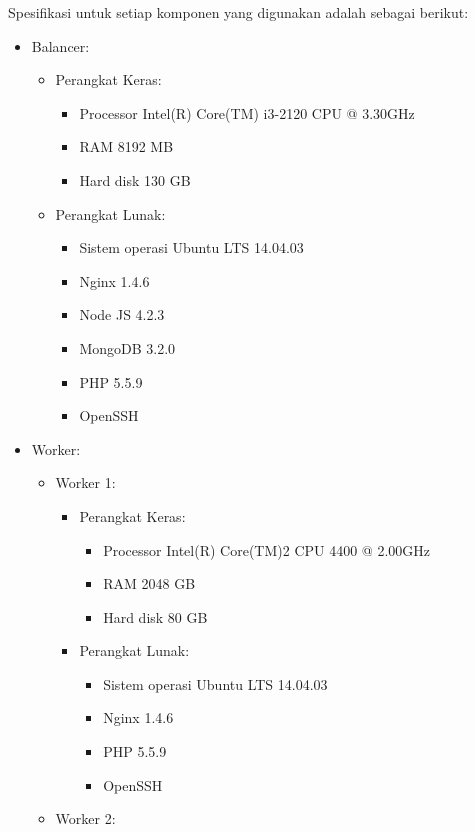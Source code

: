 \documentclass{ta-its}
\begin{document}
			Spesifikasi untuk setiap komponen yang digunakan adalah sebagai berikut:
			\begin{itemize}
				\item Balancer:
				\begin{itemize}
					\item Perangkat Keras:
					\begin{itemize}
						\item Processor Intel(R) Core(TM) i3-2120 CPU @ 3.30GHz
						\item RAM 8192 MB
						\item Hard disk 130 GB
					\end{itemize}
					\item Perangkat Lunak:
					\begin{itemize}
						\item Sistem operasi Ubuntu LTS 14.04.03
						\item Nginx 1.4.6
						\item Node JS 4.2.3
						\item MongoDB 3.2.0
						\item PHP 5.5.9
						\item OpenSSH
					\end{itemize}
				\end{itemize}
				\item Worker:
				\begin{itemize}
					\item Worker 1:
					\begin{itemize}
						\item Perangkat Keras:
						\begin{itemize}
							\item Processor Intel(R) Core(TM)2 CPU 4400 @
							2.00GHz
							\item RAM 2048 GB
							\item Hard disk 80 GB
						\end{itemize}
						\item Perangkat Lunak:
						\begin{itemize}
							\item Sistem operasi Ubuntu LTS 14.04.03
							\item Nginx 1.4.6
							\item PHP 5.5.9
							\item OpenSSH
						\end{itemize}
					\end{itemize}
					\item Worker 2:
					\begin{itemize}

\end{itemize}
\end{itemize}
\end{itemize}
\end{document}
